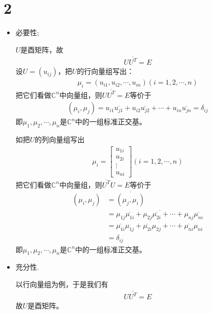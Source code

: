 \documentclass{article}
\begin{document}
\section*{2}

\begin{itemize}
  \item 必要性;

        $U$是酉矩阵，故
        \begin{align*}
          U \overline{U^T} = E
        \end{align*}
        设$U = (u_{ij})$，把$U$的行向量组写出：
        \begin{align*}
          \mu_i = (u_{i1} , u_{i2}, \cdots, u_{in}) (i = 1, 2, \cdots, n)
        \end{align*}
        把它们看做$\mathbb{C}^n$中向量组，则$U \overline{U^T} = E$等价于
        \begin{align*}
          (\mu_i, \mu_j) = u_{i1} \overline{u_{j1}} + u_{i2} \overline{u_{j2}}
          + \cdots + u_{in} \overline{u_{jn}}= \delta_{ij}
        \end{align*}
        即$\mu_1, \mu_2, \cdots, \mu_n$是$\mathbb{C}^n$中的一组标准正交基。

        如把$U$的列向量组写出
        \begin{align*}
          \mu_i = \begin{bmatrix}
                    u_{1i} \\
                    u_{2i} \\
                    \vdots \\
                    u_{ni}
                  \end{bmatrix}
          (i = 1, 2, \cdots, n)
        \end{align*}
        把它们看做$\mathbb{C}^n$中向量组，则$\overline{U^T} U = E$等价于
        \begin{align*}
          (\mu_i, \mu_j)
           & = \overline{(\mu_j, \mu_i)}                                                                                      \\
           & = \overline{\mu_{1j} \overline{\mu_{1i}} + \mu_{2j} \overline{\mu_{2i}} + \cdots + \mu_{nj} \overline{\mu_{ni}}} \\
           & = \overline{\mu_{1i}} \mu_{1j} + \overline{\mu_{2i}} \mu_{2j} + \cdots + \overline{\mu_{ni}} \mu_{ni}            \\
           & = \delta_{ij}
        \end{align*}
        即$\mu_1, \mu_2, \cdots, \mu_n$是$\mathbb{C}^n$中的一组标准正交基。

  \item 充分性.

        以行向量组为例，于是我们有
        \begin{align*}
          U \overline{U^T} = E
        \end{align*}
        故$U$是酉矩阵。
\end{itemize}
\end{document}
